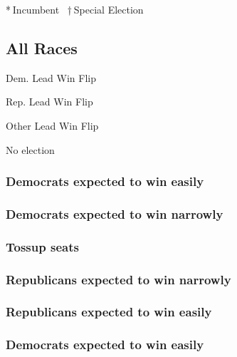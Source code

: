 \href{https://www.nytimes3xbfgragh.onion/elections/results/wyoming-senate}{}

* Incumbent~ † Special Election

\hypertarget{all-races}{%
\subsection{All Races}\label{all-races}}

Dem. Lead Win Flip

Rep. Lead Win Flip

Other Lead Win Flip

No election

\hypertarget{democrats-expected-to-win-easily}{%
\subsubsection{Democrats expected to win
easily}\label{democrats-expected-to-win-easily}}

\hypertarget{democrats-expected-to-win-narrowly}{%
\subsubsection{Democrats expected to win
narrowly}\label{democrats-expected-to-win-narrowly}}

\hypertarget{tossup-seats}{%
\subsubsection{Tossup seats}\label{tossup-seats}}

\hypertarget{republicans-expected-to-win-narrowly}{%
\subsubsection{Republicans expected to win
narrowly}\label{republicans-expected-to-win-narrowly}}

\hypertarget{republicans-expected-to-win-easily}{%
\subsubsection{Republicans expected to win
easily}\label{republicans-expected-to-win-easily}}

\hypertarget{democrats-expected-to-win-easily-1}{%
\subsubsection{Democrats expected to win
easily}\label{democrats-expected-to-win-easily-1}}

